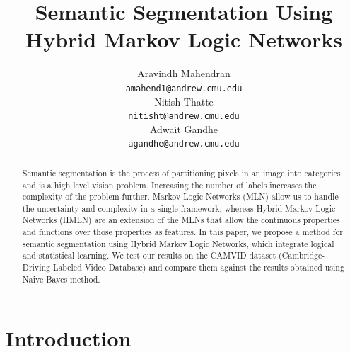 \documentclass{article} %
\title{Semantic Segmentation Using Hybrid Markov Logic Networks}
\author{
Aravindh Mahendran \\
\texttt{amahend1@andrew.cmu.edu} \\ 
\And
Nitish Thatte \\
\texttt{nitisht@andrew.cmu.edu} \\
\AND
Adwait Gandhe \\
\texttt{agandhe@andrew.cmu.edu} \\
}
\begin{document}
\maketitle

\begin{abstract}
Semantic segmentation is the process of partitioning pixels in an image into categories and is a high level vision problem. Increasing the number of labels increases the complexity of the problem further. Markov Logic Networks (MLN) allow us to handle the uncertainty and complexity in a single framework, whereas Hybrid Markov Logic Networks (HMLN) are an extension of the MLNs that allow the continuous properties and functions over those properties as features.  In this paper, we propose a method for semantic segmentation using Hybrid Markov Logic Networks, which integrate logical and statistical learning. We test our results on the CAMVID dataset (Cambridge-Driving Labeled Video Database) and compare them against the results obtained using Naive Bayes method. 
\end{abstract}


\section{Introduction}
\end{document}
